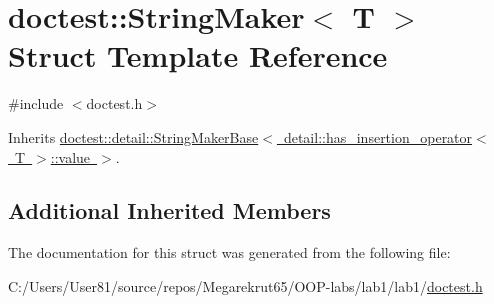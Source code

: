 \hypertarget{structdoctest_1_1_string_maker}{}\section{doctest\+:\+:String\+Maker$<$ T $>$ Struct Template Reference}
\label{structdoctest_1_1_string_maker}


{\ttfamily \#include $<$doctest.\+h$>$}



Inherits \mbox{\hyperlink{structdoctest_1_1detail_1_1_string_maker_base}{doctest\+::detail\+::\+String\+Maker\+Base$<$ detail\+::has\+\_\+insertion\+\_\+operator$<$ T $>$\+::value $>$}}.

\subsection*{Additional Inherited Members}


The documentation for this struct was generated from the following file\+:\begin{DoxyCompactItemize}
\item 
C\+:/\+Users/\+User81/source/repos/\+Megarekrut65/\+O\+O\+P-\/labs/lab1/lab1/\mbox{\hyperlink{doctest_8h}{doctest.\+h}}\end{DoxyCompactItemize}
